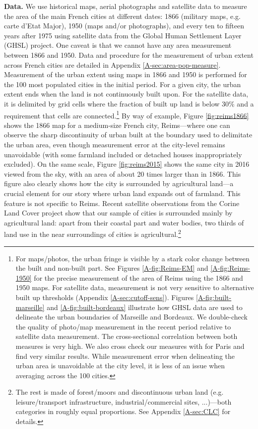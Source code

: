 \documentclass[./20250130-paper.tex]{subfiles}
\begin{document}
\textbf{Data.} We use historical maps, aerial photographs and satellite data to measure the area of the main French cities at different dates: 1866 (military maps, e.g. carte d'Etat Major), 1950 (maps and/or photographs), and every ten to fifteen years after 1975 using satellite data from the Global Human Settlement Layer (GHSL) project. One caveat is that we cannot have any area measurement between 1866 and 1950. Data and procedure for the measurement of urban extent across French cities are detailed in Appendix \ref{A-sec:area-pop-measure}. Measurement of the urban extent using maps in 1866 and 1950 is performed for the 100 most populated cities in the initial period. For a given city, the urban extent ends when the land is not continuously built upon. For the satellite data, it is delimited by grid cells where the fraction of built up land is below 30\% and a requirement that cells are connected.\footnote{For maps/photos, the urban fringe is visible by a stark color change between the built and non-built part. See Figures \ref{A-fig:Reims-EM} and \ref{A-fig:Reims-1950} for the precise measurement of the area of Reims using the 1866 and 1950 maps. For satellite data, measurement is not very sensitive to alternative built up thresholds (Appendix \ref{A-sec:cutoff-sens}). Figures \ref{A-fig:built-marseille} and \ref{A-fig:built-bordeaux} illustrate how GHSL data are used to delineate the urban boundaries of Marseille and Bordeaux. We double-check the quality of photo/map measurement in the recent period relative to satellite data measurement. The cross-sectional correlation between both measures is very high. We also cross check our measures with \cite{angel2010persistent} for Paris and find very similar results. While measurement error when delineating the urban area is unavoidable at the city level, it is less of an issue when averaging across the 100 cities.} By way of example, Figure \ref{fig:reims1866} shows the 1866 map for a medium-size French city, Reims---where one can observe the sharp discontinuity of urban built at the boundary used to delimitate the urban area, even though measurement error at the city-level remains unavoidable (with some farmland included or detached houses inappropriately excluded). On the same scale,  Figure \ref{fig:reims2015} shows the same city in 2016 viewed from the sky, with an area of about 20 times larger than in 1866. This figure also clearly shows how the city is surrounded by agricultural land---a crucial element for our story where urban land expands out of farmland. This feature is not specific to Reims. Recent satellite observations from the Corine Land Cover project show that our sample of cities is surrounded mainly by agricultural land: apart from their coastal part and water bodies, two thirds of land use in the near surroundings of cities is agricultural.\footnote{The rest is made of forest/moors and discontinuous urban land (e.g. leisure/transport infrastructure, industrial/commercial sites, ...)---both categories in roughly equal proportions. See Appendix \ref{A-sec:CLC} for details.}
\end{document}
